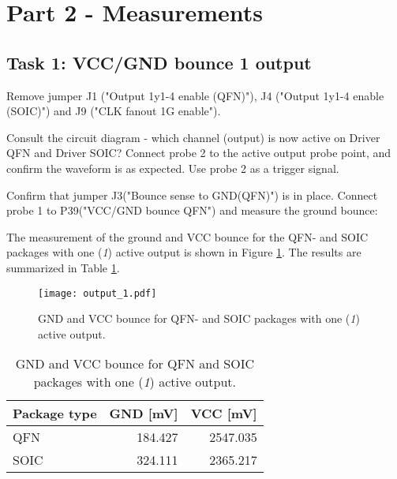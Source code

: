 \documentclass[../main.tex]{subfiles}
\begin{document}
\section{Part 2 - Measurements}

\subsection{Task 1: VCC/GND bounce 1 output}

Remove jumper J1 ("Output 1y1-4 enable (QFN)"), J4 ("Output 1y1-4 enable (SOIC)") and J9 ("CLK fanout 1G enable").

\vspace{10pt}

Consult the circuit diagram - which channel (output) is now active on Driver QFN and Driver SOIC? Connect probe 2 to the active output probe point, and confirm the waveform is as expected. Use probe 2 as a trigger signal.

\vspace{10pt}

Confirm that jumper J3("Bounce sense to GND(QFN)") is in place. Connect probe 1 to P39("VCC/GND bounce QFN") and measure the ground bounce:

\solution

The measurement of the ground and VCC bounce for the QFN- and SOIC packages with one (\textit{1}) active output is shown in Figure \ref{fig:gnd_vcc_output_1}. The results are summarized in Table \ref{tab:output_1}.

\begin{figure}[H]
    \centering
    \texttt{[image: output\_1.pdf]}
    \caption{GND and VCC bounce for QFN- and SOIC packages with one (\textit{1}) active output.}
    \label{fig:gnd_vcc_output_1}
\end{figure}

\begin{table}[H]
    \centering
    \begin{tabular}{l | r r}
        \toprule[1pt]
        Package type    & GND [mV]  & VCC [mV]\\
        \midrule
        QFN             & 184.427   & 2547.035  \\
        SOIC            & 324.111   & 2365.217  \\
        \bottomrule[1pt]
    \end{tabular}
    \caption{GND and VCC bounce for QFN and SOIC packages with one (\textit{1}) active output.}
    \label{tab:output_1}
\end{table}
\end{document}
